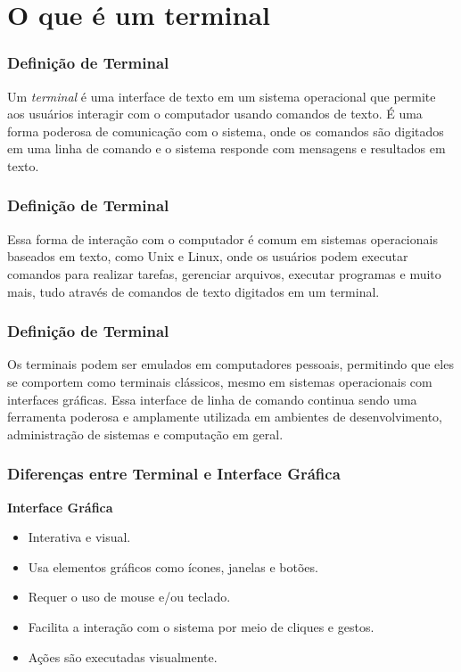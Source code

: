 \documentclass{beamer}
\begin{document}
\section*{O que é um terminal}
\begin{frame}\justifying
	\frametitle{Definição de Terminal}

	Um \textit{terminal} é uma interface de texto em um sistema operacional que permite aos usuários interagir com o computador usando comandos de texto. É uma forma poderosa de comunicação com o sistema, onde os comandos são digitados em uma linha de comando e o sistema responde com mensagens e resultados em texto.
\end{frame}


\begin{frame}\justifying
	\frametitle{Definição de Terminal}
	Essa forma de interação com o computador é comum em sistemas operacionais baseados em texto, como Unix e Linux, onde os usuários podem executar comandos para realizar tarefas, gerenciar arquivos, executar programas e muito mais, tudo através de comandos de texto digitados em um terminal.

\end{frame}

\begin{frame}\justifying
	\frametitle{Definição de Terminal}
	Os terminais podem ser emulados em computadores pessoais, permitindo que eles se comportem como terminais clássicos, mesmo em sistemas operacionais com interfaces gráficas. Essa interface de linha de comando continua sendo uma ferramenta poderosa e amplamente utilizada em ambientes de desenvolvimento, administração de sistemas e computação em geral.

\end{frame}

\begin{frame}\justifying
	\frametitle{Diferenças entre Terminal e Interface Gráfica}

	\textbf{Interface Gráfica}
	\begin{itemize}
		\item Interativa e visual.
		\item Usa elementos gráficos como ícones, janelas e botões.
		\item Requer o uso de mouse e/ou teclado.
		\item Facilita a interação com o sistema por meio de cliques e gestos.
		\item Ações são executadas visualmente.
	\end{itemize}
\end{frame}
\end{document}
